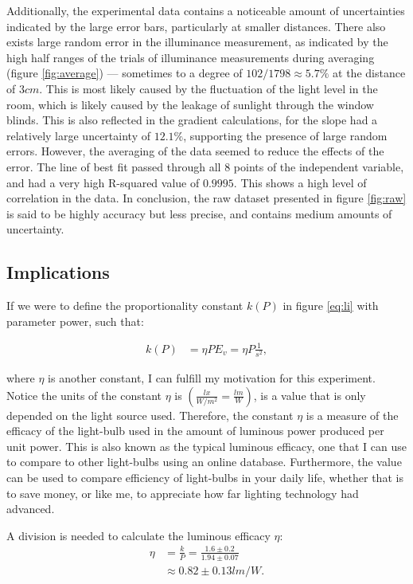\documentclass[a4paper,12pt]{article}
\begin{document}
Additionally, the experimental data contains a noticeable amount of uncertainties indicated by the large error bars, particularly at smaller distances. There also exists large random error in the illuminance measurement, as indicated by the high half ranges of the trials of illuminance measurements during averaging (figure \ref{fig:average}) --- sometimes to a degree of $102/1798 \approx 5.7\%$ at the distance of $3\si{cm}$. This is most likely caused by the fluctuation of the light level in the room, which is likely caused by the leakage of sunlight through the window blinds. This is also reflected in the gradient calculations, for the slope had a relatively large uncertainty of $12.1\%$, supporting the presence of large random errors. However, the averaging of the data seemed to reduce the effects of the error. The line of best fit passed through all 8 points of the independent variable, and had a very high R-squared value of $0.9995$. This shows a high level of correlation in the data. In conclusion, the raw dataset presented in figure \ref{fig:raw} is said to be highly accuracy but less precise, and contains medium amounts of uncertainty.

\subsection{Implications}

If we were to define the proportionality constant $k(P)$ in figure \ref{eq:li} with parameter power, such that:

\begin{align*}
    k(P) &= \eta P
    E_v = \eta P \frac{1}{s^2},
\end{align*}

where $\eta$ is another constant, I can fulfill my motivation for this experiment. Notice the units of the constant $\eta$ is $(\frac{\si{lx}}{\si{W\per m^2}} = \frac{\si{lm}}{\si{W}})$, is a value that is only depended on the light source used. Therefore, the constant $\eta$ is a measure of the efficacy of the light-bulb used in the amount of luminous power produced per unit power. This is also known as the typical luminous efficacy, one that I can use to compare to other light-bulbs using an online database. Furthermore, the value can be used to compare efficiency of light-bulbs in your daily life, whether that is to save money, or like me, to appreciate how far lighting technology had advanced.

A division is needed to calculate the luminous efficacy $\eta$:
\begin{align*}
    \eta &= \frac{k}{P} = \frac{1.6 \pm 0.2}{1.94 \pm 0.07}\\
    &\approx 0.82 \pm 0.13 \si{lm\per W}.
\end{align*}
\end{document}
